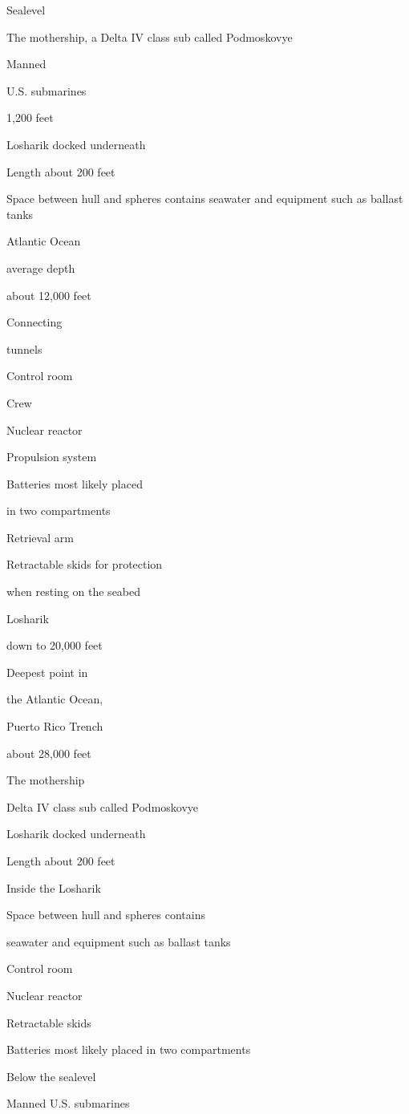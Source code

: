 Sealevel

The mothership, a Delta IV class sub called Podmoskovye

Manned

U.S. submarines

1,200 feet

Losharik docked underneath

Length about 200 feet

Space between hull and spheres contains seawater and equipment such as
ballast tanks

Atlantic Ocean

average depth

about 12,000 feet

Connecting

tunnels

Control room

Crew

Nuclear reactor

Propulsion system

Batteries most likely placed

in two compartments

Retrieval arm

Retractable skids for protection

when resting on the seabed

Losharik

down to 20,000 feet

Deepest point in

the Atlantic Ocean,

Puerto Rico Trench

about 28,000 feet

The mothership

Delta IV class sub called Podmoskovye

Losharik docked underneath

Length about 200 feet

Inside the Losharik

Space between hull and spheres contains

seawater and equipment such as ballast tanks

Control room

Nuclear reactor

Retractable skids

Batteries most likely placed in two compartments

Below the sealevel

Manned U.S. submarines

